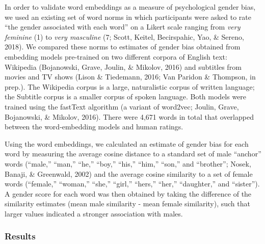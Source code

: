 \documentclass[9pt,twocolumn,twoside,lineno]{pnas-new}
\begin{document}
In order to validate word embeddings as a measure of psychological
gender bias, we used an existing set of word norms in which participants
were asked to rate \enquote{the gender associated with each word} on a
Likert scale ranging from \emph{very feminine} (1) to \emph{very
masculine} (7; Scott, Keitel, Becirspahic, Yao, \& Sereno, 2018). We
compared these norms to estimates of gender bias obtained from embedding
models pre-trained on two different corpora of English text: Wikipedia
(Bojanowski, Grave, Joulin, \& Mikolov, 2016) and subtitles from movies
and TV shows (Lison \& Tiedemann, 2016; Van Paridon \& Thompson, in
prep.). The Wikipedia corpus is a large, naturalistic corpus of written
language; the Subtitle corpus is a smaller corpus of spoken language.
Both models were trained using the fastText algorithm (a variant of
word2vec; Joulin, Grave, Bojanowski, \& Mikolov, 2016). There were 4,671
words in total that overlapped between the word-embedding models and
human ratings.

Using the word embeddings, we calculated an estimate of gender bias for
each word by measuring the average cosine distance to a standard set of
male \enquote{anchor} words (\enquote{male,} \enquote{man,}
\enquote{he,} \enquote{boy,} \enquote{his,} \enquote{him,}
\enquote{son,} and \enquote{brother}; Nosek, Banaji, \& Greenwald, 2002)
and the average cosine similarity to a set of female words
(\enquote{female,} \enquote{woman,} \enquote{she,} \enquote{girl,}
\enquote{hers,} \enquote{her,} \enquote{daughter,} and
\enquote{sister}). A gender score for each word was then obtained by
taking the difference of the similarity estimates (mean male similarity
- mean female similarity), such that larger values indicated a stronger
association with males.

\subsubsection*{Results}\label{results-1}
\end{document}
